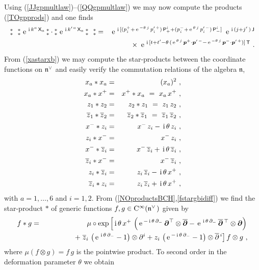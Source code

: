 \documentclass[11pt,a4paper]{article}
\newcommand{\NOa}{\mbox{$\substack{\ast\\\ast}$}}       %
\def\nn{\nonumber}
\newcommand{\1}{\mathbb{1}}
\newcommand{\mbf}[1]{{\boldsymbol {#1} }}
\def\ii{{\,{\rm i}\,}}
\def\CC{{\rm C}}
\def\P{{\sf P}}
\def\T{{\sf T}}
\def\X{{\sf X}}
\def\J{{\sf J}}
\def\mbp{{\mbf p}}
\def\mdell{{\mbf\partial}}
\def\mfn{{\mathfrak n}}
\def\nn{\nonumber}
\def\e{{\,\rm e}\,}
\def\bea{\begin{eqnarray}}
\def\eea{\end{eqnarray}}
\newcommand{\z}{\zeta}
\begin{document}
Using (\ref{JJgpmultlaw})--(\ref{QQgpmultlaw}) we may now compute the
products (\ref{TOgpprods}) and one finds
\bea
\NOa~~\NOa\,\e^{\ii k^a\,\X_a}\,\NOa\cdot\NOa\,\e^{\ii k^{\prime\,a}\,\X_a}
\,\NOa~~\NOa&=&\e^{\ii[(p_i^++\e^{-\theta\,j}\,p_i^{\prime\,+})\,
\P^i_++(p_i^-+\e^{\theta\,j}\,p_i^{\prime\,-})\,\P^i_-]}~
\e^{\ii(j+j'\,)\,\J}\nonumber\\ &&\times~
\e^{\ii[t+t'-\theta\,(\e^{\theta\,j}\,
\mbp^+\cdot\mbp^{\prime\,-}-\e^{-\theta\,j}\,
\mbp^-\cdot\mbp^{\prime\,+})]\,\T} \ .
\label{TOgpprodexpl}\eea
{}From (\ref{xastarxb}) we may compute the star-products between the
coordinate functions on $\mfn^{\vee\,}$ and easily verify the commutation
relations of the algebra $\mfn$,
\bea
x_a*x_a&=&(x_a)^2 \ , \nonumber\\x_a*x^+&=&x^+*x_a~=~x_a\,x^+ \ ,
\nonumber\\z_1*z_2&=&z_2*z_1~=~z_1\,z_2 \ , \nonumber\\
\overline{z}_1*\overline{z}_2&=&\overline{z}_2*\overline{z}_1
{}~=~\overline{z}_1\,\overline{z}_2 \ , \nonumber\\
x^-*z_i&=&x^-\,z_i-\ii\theta\,z_i \ , \nonumber\\
z_i*x^-&=&x^-\,z_i \ , \nonumber\\
x^-*\overline{z}_i&=&x^-\,\overline{z}_i+\ii\theta\,\overline{z}_i \ ,
\nonumber\\ \overline{z}_i*x^-&=&x^-\,\overline{z}_i \ , \nonumber\\
z_i*\overline{z}_i&=&z_i\,\overline{z}_i-\ii\theta\,x^+ \ , \nn\\
\overline{z}_i*z_i&=&z_i\,\overline{z}_i+\ii\theta\,x^+ \ ,
\label{TOcoordstarprods}\eea
with $a=1,\dots,6$ and $i=1,2$. From
(\ref{NOproductsBCH},\ref{fstargbidiff}) we find the star-product $*$
of generic functions $f,g\in\CC^{\infty}(\mfn^{\vee\,})$ given by
\bea
f*g&=&\mu\circ\exp\left[\ii\theta\,x^+\,\left(\e^{-\ii\theta\,\partial_-}\,
\mdell^\top\otimes\overline{\mdell}-\e^{\ii\theta\,\partial_-}\,
{\overline{\mdell}}{}^{\,\top}\otimes\mdell\right)\right.\nonumber
\\ &&\qquad\qquad+\left.\overline{z}_i\,
\left(\e^{\ii\theta\,\partial_-}-1\right)\otimes
\partial^i+z_i\,\left(\e^{-\ii\theta\,\partial_-}-1\right)
\otimes\overline{\partial}{}^{\,i}\right]f\otimes g \ ,
\label{TOstargen}\eea
where $\mu(f\otimes g)=f\,g$ is the pointwise product. To second order
in the deformation parameter $\theta$ we obtain
\end{document}
